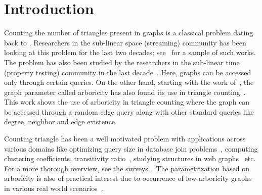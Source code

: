 \section{Introduction}

\label{sec:intro}
\noindent
Counting the number of triangles present in graphs is a classical problem dating back to \cite{DBLP:journals/siamcomp/ChibaN85,DBLP:journals/siamdm/AlonKKR08,SWExperimentalListingTriangles2005,AlonTestingFOCS2013,DBLP:conf/soda/Bar-YossefKS02}. Researchers in the sub-linear space (streaming) community has been looking at this problem for the last two decades; see~\cite{DBLP:conf/soda/Bar-YossefKS02,DBLP:conf/stacs/BeraC17,jayaram_et_al:LIPIcs.APPROX/RANDOM.2021.11, AhnGMPODS2012, TriangleCountingDynamicGraphALgorithmica2016, DBLP:journals/algorithmica/AlonYZ97, JhaSeshadriStreamingTransitivity, BuriolFLPODS06, CORMODE2017SecondLook, ShinDynamicStreamTriangle, KaneMelhornArbitrarySubgrapgICALP12} for a sample of such works. The problem has also been studied by the researchers in the sub-linear time (property testing) community in the last decade~\cite{Dana_Ron_Triangle_Counting,DBLP:conf/pods/McGregorVV16,KallaugherP17,DBLP:conf/stacs/BeraC17,BeraSeshadriStreamingDegeneracy,DBLP:conf/soda/EdenRS20,jayaram_et_al:LIPIcs.APPROX/RANDOM.2021.11}. Here, graphs can be accessed only through certain queries. On the other hand, starting with the work of~\cite{DBLP:journals/siamcomp/ChibaN85}, the graph parameter called arboricity has also found its use in triangle counting~\cite{DBLP:conf/soda/EdenRS20}.
This work shows the use of arboricity in triangle counting where the graph can be accessed through a random edge query along with other standard queries like degree, neighbor and edge existence. 

Counting triangle has been a well motivated problem with applications across various domains like optimizing query size in database join problems~\citep{DBLP:conf/soda/Bar-YossefKS02,AtseriasDatabaseJoinJComp,assadi2018simple}, computing clustering coefficients, transitivity ratio~\citep{CAggarwalEvolutionaryNetworkSurvey,LucePerry1949AMO,watts_collective_1998, LeskovecBKT/SIGKDD08/EvolSocNet}, studying structures in web graphs~\citep{Eckmann2001CurvatureOC, DanischBS/WWW18.RealWorldDegeneracy} etc. For a more thorough overview, see the surveys~\citep{Hasan2018TriangleCI,TsourakakisJournalOG}. The parametrization based on arboricity is also of practical interest due to occurrence of low-arboricity graphs in various real world scenarios~\citep{DoryGI/BoundedArboricity/PODC22,LowArboricityMatching/FSTTCS2024/Konrad,OnakSSW/LowArboricityMinorFree/ACMTrAlg,GoelGustedtBoundedArboricity,beraCG/BoundedArboricity:LIPIcs.ICALP.2020.11,DanischBS/WWW18.RealWorldDegeneracy,ShinRealWorldKCore/JKInfSyst}.


